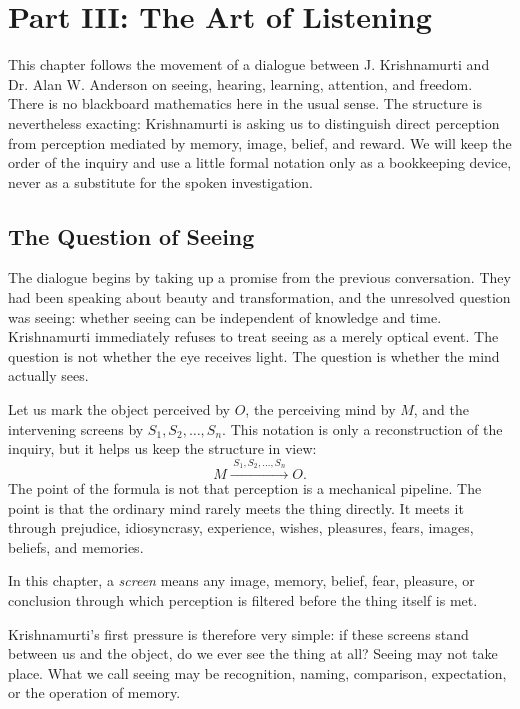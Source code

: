 \chapter{Part III: The Art of Listening}

This chapter follows the movement of a dialogue between J. Krishnamurti and Dr. Alan W. Anderson on seeing, hearing, learning, attention, and freedom. There is no blackboard mathematics here in the usual sense. The structure is nevertheless exacting: Krishnamurti is asking us to distinguish direct perception from perception mediated by memory, image, belief, and reward. We will keep the order of the inquiry and use a little formal notation only as a bookkeeping device, never as a substitute for the spoken investigation.

\section{The Question of Seeing}

The dialogue begins by taking up a promise from the previous conversation. They had been speaking about beauty and transformation, and the unresolved question was seeing: whether seeing can be independent of knowledge and time. Krishnamurti immediately refuses to treat seeing as a merely optical event. The question is not whether the eye receives light. The question is whether the mind actually sees.

Let us mark the object perceived by \(O\), the perceiving mind by \(M\), and the intervening screens by \(S_1,S_2,\ldots,S_n\). This notation is only a reconstruction of the inquiry, but it helps us keep the structure in view:
\begin{equation}
M \xrightarrow{\;S_1,S_2,\ldots,S_n\;} O .
\end{equation}
The point of the formula is not that perception is a mechanical pipeline. The point is that the ordinary mind rarely meets the thing directly. It meets it through prejudice, idiosyncrasy, experience, wishes, pleasures, fears, images, beliefs, and memories.

\begin{definition}
In this chapter, a \emph{screen} means any image, memory, belief, fear, pleasure, or conclusion through which perception is filtered before the thing itself is met.
\end{definition}

Krishnamurti's first pressure is therefore very simple: if these screens stand between us and the object, do we ever see the thing at all? Seeing may not take place. What we call seeing may be recognition, naming, comparison, expectation, or the operation of memory.

